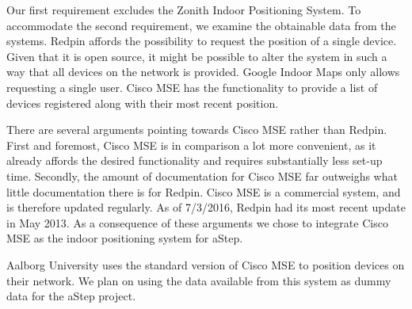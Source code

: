 Our first requirement excludes the Zonith Indoor Positioning System. To accommodate the second requirement, we examine the obtainable data from the systems. Redpin affords the possibility to request the position of a single device. Given that it is open source, it might be possible to alter the system in such a way that all devices on the network is provided. Google Indoor Maps only allows requesting a single user. Cisco MSE has the functionality to provide a list of devices registered along with their most recent position.

There are several arguments pointing towards Cisco MSE rather than Redpin. First and foremost, Cisco MSE is in comparison a lot more convenient, as it already affords the desired functionality and requires substantially less set-up time. Secondly, the amount of documentation for Cisco MSE far outweighs what little documentation there is for Redpin. Cisco MSE is a commercial system, and is therefore updated regularly. As of 7/3/2016, Redpin had its most recent update in May 2013. As a consequence of these arguments we chose to integrate Cisco MSE as the indoor positioning system for aStep.

Aalborg University uses the standard version of Cisco MSE to position devices on their network. We plan on using the data available from this system as dummy data for the aStep project.